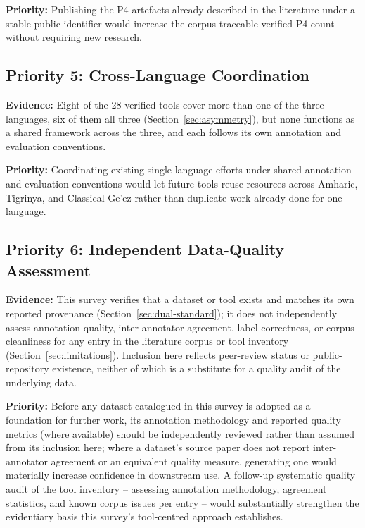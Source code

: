 \documentclass[sn-mathphys-num]{sn-jnl}
\theoremstyle{thmstyleone}
\theoremstyle{thmstyletwo}
\theoremstyle{thmstylethree}
\begin{document}
\textbf{Priority:} Publishing the P4 artefacts already described in the literature under a stable public identifier would increase the corpus-traceable verified P4 count without requiring new research.

\subsection{Priority 5: Cross-Language Coordination}

\textbf{Evidence:} Eight of the 28 verified tools cover more than one of the three languages, six of them all three (Section~\ref{sec:asymmetry}), but none functions as a shared framework across the three, and each follows its own annotation and evaluation conventions.

\textbf{Priority:} Coordinating existing single-language efforts under shared annotation and evaluation conventions would let future tools reuse resources across Amharic, Tigrinya, and Classical Ge'ez rather than duplicate work already done for one language.

\subsection{Priority 6: Independent Data-Quality Assessment}

\textbf{Evidence:} This survey verifies that a dataset or tool exists and matches its own reported provenance (Section~\ref{sec:dual-standard}); it does not independently assess annotation quality, inter-annotator agreement, label correctness, or corpus cleanliness for any entry in the literature corpus or tool inventory (Section~\ref{sec:limitations}). Inclusion here reflects peer-review status or public-repository existence, neither of which is a substitute for a quality audit of the underlying data.

\textbf{Priority:} Before any dataset catalogued in this survey is adopted as a foundation for further work, its annotation methodology and reported quality metrics (where available) should be independently reviewed rather than assumed from its inclusion here; where a dataset's source paper does not report inter-annotator agreement or an equivalent quality measure, generating one would materially increase confidence in downstream use. A follow-up systematic quality audit of the tool inventory -- assessing annotation methodology, agreement statistics, and known corpus issues per entry -- would substantially strengthen the evidentiary basis this survey's tool-centred approach establishes.
\end{document}

